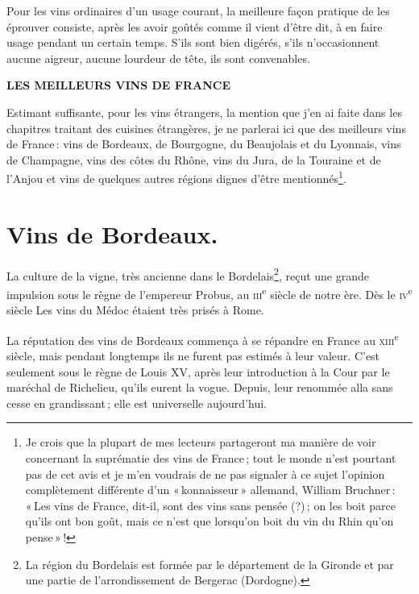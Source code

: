 Pour les vins ordinaires d'un usage courant, la meilleure façon pratique de les
éprouver consiste, après les avoir goûtés comme il vient d'être dit, à en faire
usage pendant un certain temps. S'ils sont bien digérés, s'ils n'occasionnent
aucune aigreur, aucune lourdeur de tête, ils sont convenables.
 
\newpage
\vspace*{4\baselineskip}
\centerline{\large\textbf{LES MEILLEURS VINS DE FRANCE}}
\bigskip
\bigskip
\sk
\bigskip
\bigskip

Estimant suffisante, pour les vins étrangers, la mention que j'en ai faite dans
les chapitres traitant des cuisines étrangères, je ne parlerai ici que des
meilleurs vins de France : vins de Bordeaux, de Bourgogne, du Beaujolais et du
Lyonnais, vins de Champagne, vins des côtes du Rhône, vins du Jura, de la
Touraine et de l'Anjou et vins de quelques autres régions dignes d'être
mentionnés\footnote{Je crois que la plupart de mes lecteurs partageront ma
manière de voir concernant la suprématie des vins de France ; tout le monde
n'est pourtant pas de cet avis et je m'en voudrais de ne pas signaler à ce
sujet l'opinion complètement différente d'un « konnaisseur » allemand, William
Bruchner : « Les vins de France, dit-il, sont des vins sans pensée (?) ; on les
boit parce qu'ils ont bon goût, mais ce n’est que lorsqu'on boit du vin du Rhin
qu'on pense » !}.

\section*{\centering Vins de Bordeaux.}

La culture de la vigne, très ancienne dans le Bordelais\footnote{La région du
Bordelais est formée par le département de la Gironde et par une partie de
l'arrondissement de Bergerac (Dordogne).}, reçut une grande impulsion sous le
règne de l'empereur Probus, au \textsc{iii}\textsuperscript{e} siècle de notre
ère. Dès le \textsc{iv}\textsuperscript{e} siècle Les vins du Médoc étaient
très prisés à Rome.

La réputation des vins de Bordeaux commença à se répandre en France au
\textsc{xiii}\textsuperscript{e} siècle, mais pendant longtemps ils ne furent
pas estimés à leur valeur. C’est seulement sous le règne de Louis XV, après
leur introduction à la Cour par le maréchal de Richelieu, qu'ils eurent la
vogue. Depuis, leur renommée alla sans cesse en grandissant ; elle est
universelle aujourd'hui.

